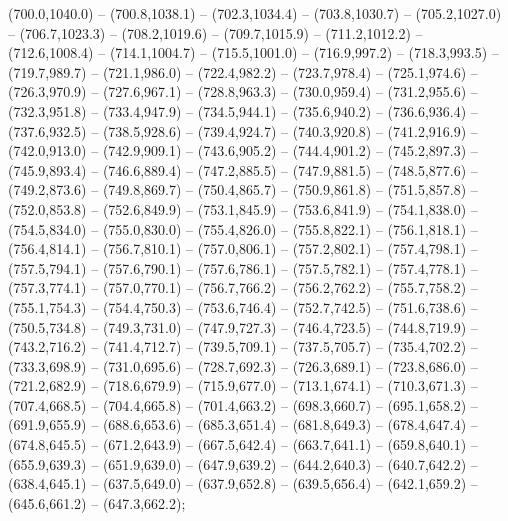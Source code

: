  (700.0,1040.0) -- (700.8,1038.1) -- (702.3,1034.4) -- (703.8,1030.7) -- (705.2,1027.0) -- (706.7,1023.3) -- (708.2,1019.6) -- (709.7,1015.9) -- (711.2,1012.2) -- (712.6,1008.4) -- (714.1,1004.7) -- (715.5,1001.0) -- (716.9,997.2) -- (718.3,993.5) -- (719.7,989.7) -- (721.1,986.0) -- (722.4,982.2) -- (723.7,978.4) -- (725.1,974.6) -- (726.3,970.9) -- (727.6,967.1) -- (728.8,963.3) -- (730.0,959.4) -- (731.2,955.6) -- (732.3,951.8) -- (733.4,947.9) -- (734.5,944.1) -- (735.6,940.2) -- (736.6,936.4) -- (737.6,932.5) -- (738.5,928.6) -- (739.4,924.7) -- (740.3,920.8) -- (741.2,916.9) -- (742.0,913.0) -- (742.9,909.1) -- (743.6,905.2) -- (744.4,901.2) -- (745.2,897.3) -- (745.9,893.4) -- (746.6,889.4) -- (747.2,885.5) -- (747.9,881.5) -- (748.5,877.6) -- (749.2,873.6) -- (749.8,869.7) -- (750.4,865.7) -- (750.9,861.8) -- (751.5,857.8) -- (752.0,853.8) -- (752.6,849.9) -- (753.1,845.9) -- (753.6,841.9) -- (754.1,838.0) -- (754.5,834.0) -- (755.0,830.0) -- (755.4,826.0) -- (755.8,822.1) -- (756.1,818.1) -- (756.4,814.1) -- (756.7,810.1) -- (757.0,806.1) -- (757.2,802.1) -- (757.4,798.1) -- (757.5,794.1) -- (757.6,790.1) -- (757.6,786.1) -- (757.5,782.1) -- (757.4,778.1) -- (757.3,774.1) -- (757.0,770.1) -- (756.7,766.2) -- (756.2,762.2) -- (755.7,758.2) -- (755.1,754.3) -- (754.4,750.3) -- (753.6,746.4) -- (752.7,742.5) -- (751.6,738.6) -- (750.5,734.8) -- (749.3,731.0) -- (747.9,727.3) -- (746.4,723.5) -- (744.8,719.9) -- (743.2,716.2) -- (741.4,712.7) -- (739.5,709.1) -- (737.5,705.7) -- (735.4,702.2) -- (733.3,698.9) -- (731.0,695.6) -- (728.7,692.3) -- (726.3,689.1) -- (723.8,686.0) -- (721.2,682.9) -- (718.6,679.9) -- (715.9,677.0) -- (713.1,674.1) -- (710.3,671.3) -- (707.4,668.5) -- (704.4,665.8) -- (701.4,663.2) -- (698.3,660.7) -- (695.1,658.2) -- (691.9,655.9) -- (688.6,653.6) -- (685.3,651.4) -- (681.8,649.3) -- (678.4,647.4) -- (674.8,645.5) -- (671.2,643.9) -- (667.5,642.4) -- (663.7,641.1) -- (659.8,640.1) -- (655.9,639.3) -- (651.9,639.0) -- (647.9,639.2) -- (644.2,640.3) -- (640.7,642.2) -- (638.4,645.1) -- (637.5,649.0) -- (637.9,652.8) -- (639.5,656.4) -- (642.1,659.2) -- (645.6,661.2) -- (647.3,662.2);
